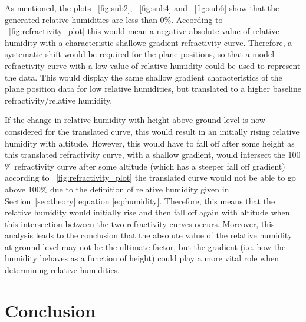 \documentclass[11pt]{article}
\newcommand{\figref}[2][\figurename~]{#1\ref{#2}}
\newcommand{\secref}[2][Section~]{#1\ref{#2}}
\begin{document}
\vspace{2mm}
\noindent
As mentioned, the plots \figref{fig:sub2}, \figref{fig:sub4} and \figref{fig:sub6} show that the generated relative humidities are less than 0$\%$. According to \figref{fig:refractivity_plot} this would mean a negative absolute value of relative humidity with a characteristic shallowe gradient refractivity curve. Therefore, a systematic shift would be required for the plane positions, so that a model refractivity curve with a low value of relative humidity could be used to represent the data. This would display the same shallow gradient characteristics of the plane position data for low relative humidities, but translated to a higher baseline refractivity/relative humidity. 

\vspace{2mm}
\noindent
If the change in relative humidity with height above ground level is now considered for the translated curve, this would result in an initially rising relative humidity with altitude. However, this would have to fall off after some height as this translated refractivity curve, with a shallow gradient, would intersect the 100$\%$ refractivity curve after some altitude (which has a steeper fall off gradient) according to \figref{fig:refractivity_plot} \textemdash the translated curve would not be able to go above 100$\%$ due to the definition of relative humidity given in \secref{sec:theory} equation \eqref{eq:humidity}. Therefore, this means that the relative humidity would initially rise and then fall off again with altitude when this intersection between the two refractivity curves occurs. Moreover, this analysis leads to the conclusion that the absolute value of the relative humidity at ground level may not be the ultimate factor, but the gradient (i.e. how the humidity behaves as a function of height) could play a more vital role when determining relative humidities.


\section{Conclusion}
\label{sec:conclusion}
\end{document}
